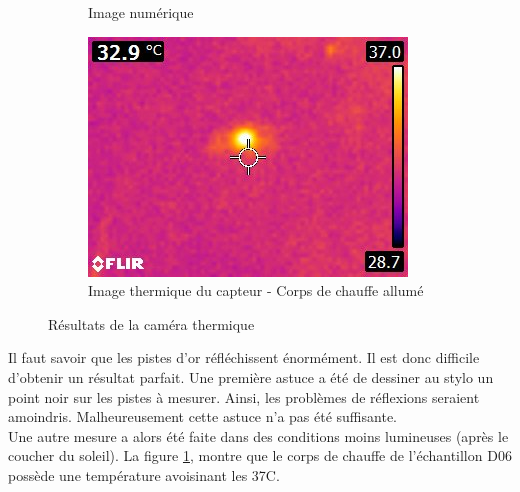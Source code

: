 \begin{figure}[H]
\begin{subfigure}[b]{0.3\textwidth}
        \caption{Image numérique}
    \end{subfigure}
    \begin{subfigure}[b]{0.4\textwidth}
        \includegraphics[scale = 0.5]{assets/figures/thermique_avec_chauffe.jpg}
        \caption{Image thermique du capteur - Corps de chauffe allumé}
    \end{subfigure}
    \caption{Résultats de la caméra thermique}
    \label{fig:cameraThermique}
\end{figure}

Il faut savoir que les pistes d'or réfléchissent énormément. Il est donc difficile d'obtenir un résultat parfait. Une première astuce a été de
dessiner au stylo un point noir sur les pistes à mesurer. Ainsi, les problèmes de réflexions seraient amoindris. Malheureusement cette astuce n'a
pas été suffisante. \\

Une autre mesure a alors été faite dans des conditions moins lumineuses (après le coucher du soleil). La figure \ref*{fig:cameraThermique},
montre que le corps de chauffe de l'échantillon D06 possède une température avoisinant les 37\textdegree C. \\


